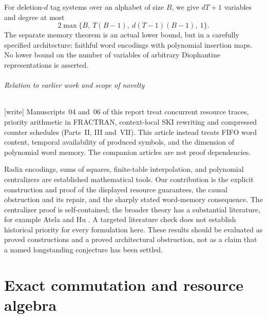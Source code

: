 \documentclass[11pt,a4paper]{article}
\theoremstyle{definition}
\theoremstyle{remark}
\newcommand{\wtag}{\textup{[write]}}%
\begin{document}
For deletion-$d$ tag systems over an alphabet of size $B$, we give $dT+1$ variables and degree at most
\[
 2\max\{B,\ T(B-1),\ d(T-1)(B-1),\ 1\}.
\]
The separate memory theorem is an actual lower bound, but in a carefully specified architecture: faithful word encodings with polynomial insertion maps. No lower bound on the number of variables of arbitrary Diophantine representations is asserted.

\paragraph{Relation to earlier work and scope of novelty}
\wtag{} Manuscripts~04 and~06 of this report treat concurrent resource traces, priority arithmetic in FRACTRAN, context-local SKI rewriting and compressed counter schedules (Parts~II, III and~VII). This article instead treats FIFO word content, temporal availability of produced symbols, and the dimension of polynomial word memory. The companion articles are not proof dependencies.

Radix encodings, sums of squares, finite-table interpolation, and polynomial centralizers are established mathematical tools. Our contribution is the explicit construction and proof of the displayed resource guarantees, the causal obstruction and its repair, and the sharply stated word-memory consequence. The centralizer proof is self-contained; the broader theory has a substantial literature, for example Atela and Hu \cite{atela-hu}. A targeted literature check does not establish historical priority for every formulation here. These results should be evaluated as proved constructions and a proved architectural obstruction, not as a claim that a named longstanding conjecture has been settled.


\part{Exact commutation and resource algebra}\label{cdc:part:resource}
\end{document}
